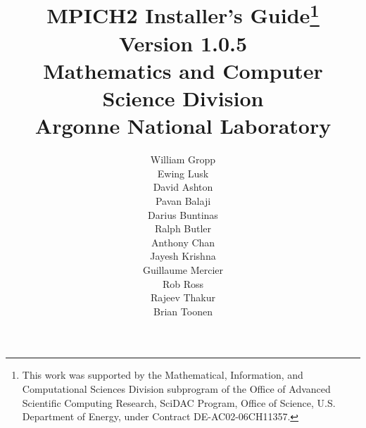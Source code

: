 \documentclass[dvipdfm,11pt]{article}
\begin{document}
\title{{\bf MPICH2 Installer's Guide}\thanks{This work was supported by the
    Mathematical, Information, and Computational Sciences Division
    subprogram of the Office of Advanced Scientific Computing Research,
    SciDAC Program, Office of Science, U.S. Department of Energy, under
    Contract DE-AC02-06CH11357.}\\
  Version 1.0.5\\
  Mathematics and Computer Science Division\\
  Argonne National Laboratory}

\author{William Gropp\\
Ewing Lusk\\
David Ashton\\
Pavan Balaji\\
Darius Buntinas\\
Ralph Butler\\
Anthony Chan\\
Jayesh Krishna\\
Guillaume Mercier\\
Rob Ross\\
Rajeev Thakur\\
Brian Toonen}

\maketitle
\cleardoublepage

\tableofcontents
\clearpage

\pagestyle{headings}


\end{document}
